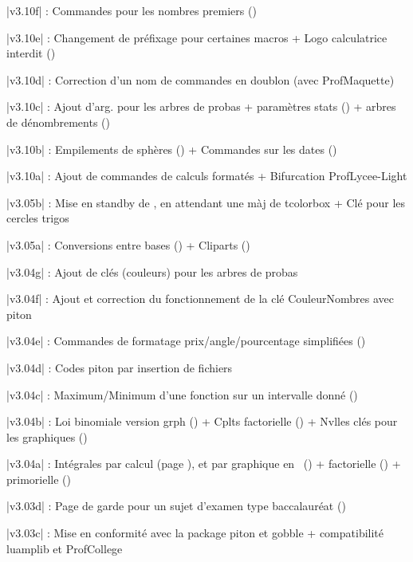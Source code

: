 {\small \bverb|v3.10f| : Commandes pour les nombres premiers (\pageref{nbspremiers})}

{\small \bverb|v3.10e| : Changement de préfixage pour certaines macros + Logo calculatrice interdit (\pageref{pflnocalc})}

{\small \bverb|v3.10d| : Correction d'un nom de commandes en doublon (avec \textsf{ProfMaquette})}

{\small \bverb|v3.10c| : Ajout d'arg. pour les arbres de probas + paramètres stats (\pageref{paramstats}) + arbres de dénombrements (\pageref{arbdenomb})}

{\small \bverb|v3.10b| : Empilements de sphères (\pageref{pyramballes}) + Commandes sur les dates (\pageref{dates})}

{\small \bverb|v3.10a| : Ajout de commandes de calculs formatés + Bifurcation \textsf{ProfLycee-Light}}

{\small \bverb|v3.05b| : Mise en standby de , en attendant une màj de \textsf{tcolorbox} + Clé pour les cercles trigos}

{\small \bverb|v3.05a| : Conversions entre bases (\pageref{basetobase}) + Cliparts (\pageref{cliparts})}

{\small \bverb|v3.04g| : Ajout de clés (couleurs) pour les arbres de probas}

{\small \bverb|v3.04f| : Ajout et correction du fonctionnement de la clé \textsf{CouleurNombres} avec \textsf{piton}}

{\small \bverb|v3.04e| : Commandes de formatage \textsf{prix/angle/pourcentage} simplifiées (\pageref{numfmt})}

{\small \bverb|v3.04d| : Codes \textsf{piton} par insertion de fichiers}

{\small \bverb|v3.04c| : Maximum/Minimum d'une fonction sur un intervalle donné (\pageref{maxmin})}

{\small \bverb|v3.04b| : Loi binomiale version grph (\pageref{histobinom}) + Cplts factorielle (\pageref{clptfacto}) + Nvlles clés pour les graphiques (\pageref{reperagetikz})}


{\small \bverb|v3.04a| : Intégrales par calcul (page \pageref{calculintegrale}), et par graphique en \TikZ\ (\pageref{integrtikz}) + factorielle (\pageref{factoriel}) + primorielle (\pageref{primoriel})}

{\small \bverb|v3.03d| : Page de garde pour un sujet d'examen type baccalauréat (\pageref{pagegardebac})}

{\small \bverb|v3.03c| : Mise en conformité avec la package \textsf{piton} et \textsf{gobble} + compatibilité \textsf{luamplib} et \textsf{ProfCollege}}

